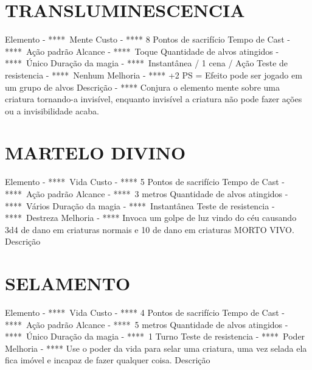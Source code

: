 \documentclass{article}%
\begin{document}
%
\section{TRANSLUMINESCENCIA}%
\label{sec:TRANSLUMINESCENCIA}%
Elemento {-} ****~Mente\newline%
Custo {-} **** 8 Pontos de sacrifício\newline%
Tempo de Cast {-} ****~Ação padrão\newline%
Alcance {-} ****~Toque\newline%
Quantidade de alvos atingidos {-} ****~Único\newline%
Duração da magia {-} ****~Instantânea / 1 cena / Ação\newline%
Teste de resistencia {-} ****~Nenhum\newline%
Melhoria {-} **** +2 PS = Efeito pode ser jogado em um grupo de alvos\newline%
Descrição {-} **** Conjura o elemento mente sobre uma criatura tornando{-}a invisível, enquanto invisível a criatura não pode fazer ações ou a invisibilidade acaba.\newline%

%
\section{MARTELO DIVINO}%
\label{sec:MARTELODIVINO}%
Elemento {-} ****~Vida\newline%
Custo {-} **** 5 Pontos de sacrifício\newline%
Tempo de Cast {-} ****~Ação padrão\newline%
Alcance {-} ****~3 metros\newline%
Quantidade de alvos atingidos {-} ****~Vários\newline%
Duração da magia {-} ****~Instantânea\newline%
Teste de resistencia {-} ****~Destreza\newline%
Melhoria {-} **** Invoca um golpe de luz vindo do céu causando 3d4 de dano em criaturas normais e 10 de dano em criaturas MORTO VIVO.\newline%
Descrição \newline%

%
\section{SELAMENTO}%
\label{sec:SELAMENTO}%
Elemento {-} ****~Vida\newline%
Custo {-} **** 4 Pontos de sacrifício\newline%
Tempo de Cast {-} ****~Ação padrão\newline%
Alcance {-} ****~5 metros\newline%
Quantidade de alvos atingidos {-} ****~Único\newline%
Duração da magia {-} ****~1 Turno\newline%
Teste de resistencia {-} ****~Poder\newline%
Melhoria {-} **** Use o poder da vida para selar uma criatura, uma vez selada ela fica imóvel e incapaz de fazer qualquer coisa.\newline%
Descrição \newline%
\end{document}
